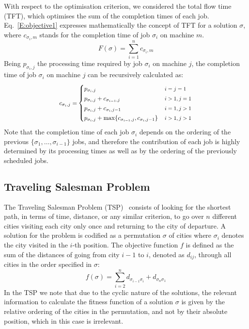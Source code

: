 \documentclass[conference]{IEEEtran}
\begin{document}
With respect to the optimisation criterion, we considered the total flow time (TFT), which optimises the sum of the completion times of each job. Eq.~\ref{E:objective1} expresses mathematically the concept of TFT for a solution $\sigma$, where $c_{\sigma_i,m}$ stands for the completion time of job $\sigma_i$ on machine $m$.
\begin{equation}
F(\sigma)=\sum_{i=1}^n c_{\sigma_i,m}
\label{E:objective1}
\end{equation}
Being $p_{\sigma_i,j}$ the processing time required by job $\sigma_i$ on machine $j$, the completion time of job $\sigma_i$ on machine $j$ can be recursively calculated as:
\begin{equation*}
\scalebox{0.9}{$c_{\sigma_i,j}=$}
\begin{cases} 
\scalebox{0.9}{$p_{\sigma_i,j}$} & \scalebox{0.8}{$i = j = 1$}\\
\scalebox{0.9}{$p_{\sigma_i,j} + c_{\sigma_{i-1},j}$} & \scalebox{0.8}{$i > 1, j = 1$}\\
\scalebox{0.9}{$p_{\sigma_i,j} + c_{\sigma_i,j-1}$} & \scalebox{0.8}{$i = 1, j > 1$}\\
\scalebox{0.9}{$p_{\sigma_i,j} + \max\{c_{\sigma_{i-1},j},c_{\sigma_i,j-1}\}$} & \scalebox{0.8}{$i > 1, j > 1$}
\end{cases}
\label{E:completion1}
\end{equation*}
Note that the completion time of each job $\sigma_i$ depends on the ordering of the previous $\{\sigma_1,\ldots,\sigma_{i-1}\}$ jobs, and therefore the contribution of each job is highly determined by its processing times as well as by the ordering of the previously scheduled jobs.

\subsection{Traveling Salesman Problem}
The Traveling Salesman Problem (TSP)~\cite{DBLP:conf/icga/GoldbergL85} consists of looking for the shortest path, in terms of time, distance, or any similar criterion, to go over $n$ different cities visiting each city only once and returning to the city of departure. A solution for the problem is codified as a permutation $\sigma$ of cities where $\sigma_i$ denotes the city visited in the $i$-th position. The objective function $f$ is defined as the sum of the distances of going from city $i-1$ to $i$, denoted as $d_{ij}$, through all cities in the order specified in $\sigma$: \[f(\sigma)=\sum_{i=2}^n d_{\sigma_{i-1}\sigma_i} + d_{\sigma_n\sigma_1}\]
In the TSP we note that due to the cyclic nature of the solutions, the relevant information to calculate the fitness function of a solution $\sigma$ is given by the relative ordering of the cities in the permutation, and not by their absolute position, which in this case is irrelevant.
\end{document}
